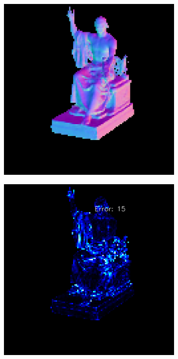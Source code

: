 \begin{figure}
\begin{subfigure}[b]{0.24\linewidth}
	\end{subfigure}
	\begin{subfigure}[b]{0.24\linewidth}
		\includegraphics[width=\linewidth]{./Figures/gcnn_synthetic/fancy_eval_3_normal_GCNN-GCNN.png}
	\end{subfigure}
	\begin{subfigure}[b]{0.24\linewidth}
		\includegraphics[width=\linewidth]{./Figures/gcnn_synthetic/fancy_eval_3_error_GCNN-GCNN.png}
	\end{subfigure}
	

\end{figure}
